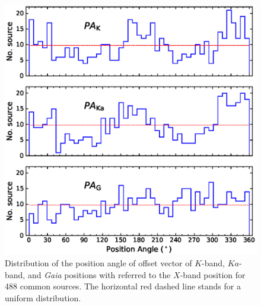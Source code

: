 \documentclass{aa-note}   %
\begin{document}
\begin{figure}[hbtp]
    \centering
    \includegraphics[width=\columnwidth]{figs/pa-hist}
    \caption[]{\label{fig:pa-hist}
        Distribution of the position angle of offset vector of $K$-band, $Ka$-band, and \textit{Gaia} positions with referred to the $X$-band position for 488 common sources.
        The horizontal red dashed line stands for a uniform distribution.
    }
\end{figure}
\end{document}
